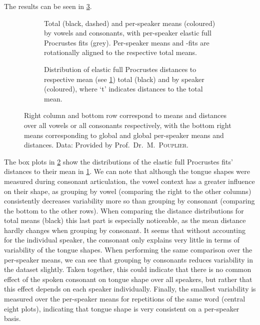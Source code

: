 The results can be seen in \cref{fig:4-tounges}.
\begin{figure}
  \centering
  \advance\leftskip-1cm
  \begin{subfigure}[t]{0.72\textwidth}
    \centering
    \centering
    \caption{Total (black, dashed) and per-speaker means (coloured) by vowels and consonants, with per-speaker elastic full Procrustes fits (grey). 
    Per-speaker means and -fits are rotationally aligned to the respective total means.}
    \label{fig:4-tongue-means}
  \end{subfigure}%
  \begin{subfigure}[t]{0.40\textwidth}
    \centering
    \centering
    \caption{Distribution of elastic full Procrustes distances to respective mean (see \cref{fig:4-tongue-means}) total (black) and by speaker (coloured), where \enquote*{t} indicates distances to the total mean.}
    \label{fig:4-tongue-dists}
  \end{subfigure}
  \caption{Right column and bottom row correspond to means and distances over all vowels or all consonants respectively, with the bottom right means corresponding to global and global per-speaker means and distances.
    Data: Provided by Prof.\ Dr.\ M.\ \textsc{Pouplier}.}
  \label{fig:4-tounges}
\end{figure}
The box plots in \cref{fig:4-tongue-dists} show the distributions of the elastic full Procrustes fits' distances to their  mean in \cref{fig:4-tongue-means}.
We can note that although the tongue shapes were measured during consonant articulation, the vowel context has a greater influence on their shape, as grouping by vowel (comparing the right to the other columns) consistently decreases variability more so than grouping by consonant (comparing the bottom to the other rows). 
When comparing the distance distributions for total means (black) this last part is especially noticeable, as the mean distance hardly changes when grouping by consonant.
It seems that without accounting for the individual speaker, the consonant only explains very little in terms of variability of the tongue shapes.
When performing the same comparison over the per-speaker means, we can see that grouping by consonants reduces variability in the dataset slightly.
Taken together, this could indicate that there is no common effect of the spoken consonant on tongue shape over all speakers, but rather that this effect depends on each speaker individually.
Finally, the smallest variability is measured over the per-speaker means for repetitions of the same word (central eight plots), indicating that tongue shape is very consistent on a per-speaker basis.

